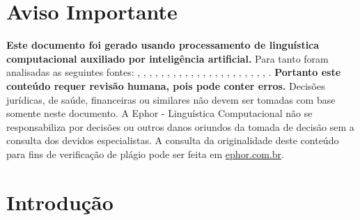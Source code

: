 \documentclass[
   article,       
   12pt,          
   oneside,       
   a4paper,       
   english,       
   brazil,        
   sumario=tradicional
   ]{abntex2}
\begin{document}
\frenchspacing 
\maketitle

\textual
\section{Aviso Importante}
\textbf{Este documento foi gerado usando processamento de linguística computacional auxiliado por inteligência artificial.} Para tanto foram analisadas as seguintes fontes:  \cite{A_CAUSA_E_AS_POLITICAS_DE_DIREITOS_HUMANOS_NO}, \cite{Ciclo_de_Politicas_Publicas_por_que_e_importa}, \cite{Conheca_o_ciclo_das_politicas_publicas__Polit}, \cite{Educacao_Inclusiva_Conheca_o_historico_da_leg}, \cite{Em_Buenos_Aires_Silvio_Almeida_defende_a_inst}, \cite{Entendendo_a_Tipologia_de_Politicas_Publicas_}, \cite{Escola_Nacional_de_Administracao_Publica__Wik}, \cite{Especialista_em_politicas_publicas_e_gestao_g}, \cite{FEDERALISMO_E_POLITICAS_PUBLICAS_NO_BRASIL_Ho}, \cite{Institucionalizacao_das_politicas_em_Direitos}, \cite{Ministerio_do_Planejamento_e_Orcamento__Wikip}, \cite{Ministro_defende_que_direitos_humanos_precisa}, \cite{Politica_conceito_politicas_publicas_e_partid}, \cite{Politica_publica__o_que_e_tipos_de_politicas_}, \cite{Politica_publica__Wikipedia_a_enciclopedia_li}, \cite{Politicas_publicas__Wikipedia_la_enciclopedia}, \cite{Politicas_Publicas_entenda_o_que_sao_para_que}, \cite{Politicas_Publicas_o_que_sao_e_para_que_serve}, \cite{Politicas_publicas_o_que_sao_e_para_que_serve}, \cite{Politicas_publicas_o_que_sao_quem_faz_e_tipos}, \cite{Politicas_publicas_o_que_sao_tipos_e_exemplos}, \cite{Revista_USP_119__Dossie_1_Democracia_e_politi}, \cite{TCU_Ciclo_das_politicas_publicas__Tudo_o_que_}.
\textbf{Portanto este conteúdo requer revisão humana, pois pode conter erros.} Decisões jurídicas, de saúde, financeiras ou similares não devem ser tomadas com base somente neste documento. A Ephor - Linguística Computacional não se responsabiliza por decisões ou outros danos oriundos da tomada de decisão sem a consulta dos devidos especialistas.
A consulta da originalidade deste conteúdo para fins de verificação de plágio pode ser feita em \href{http://www.ephor.com.br}{ephor.com.br}.

\section{Introdução}
\end{document}
